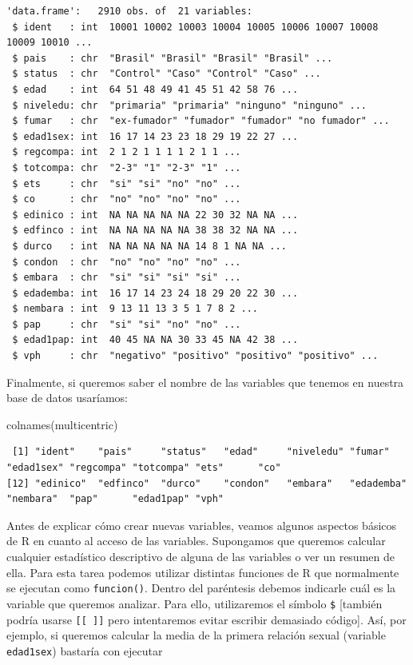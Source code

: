 \documentclass[
]{book}
\newenvironment{Shaded}{\begin{snugshade}}{\end{snugshade}}
\newcommand{\FunctionTok}[1]{\textcolor[rgb]{0.00,0.00,0.00}{#1}}
\newcommand{\NormalTok}[1]{#1}
\begin{document}
\begin{verbatim}
'data.frame':   2910 obs. of  21 variables:
 $ ident   : int  10001 10002 10003 10004 10005 10006 10007 10008 10009 10010 ...
 $ pais    : chr  "Brasil" "Brasil" "Brasil" "Brasil" ...
 $ status  : chr  "Control" "Caso" "Control" "Caso" ...
 $ edad    : int  64 51 48 49 41 45 51 42 58 76 ...
 $ niveledu: chr  "primaria" "primaria" "ninguno" "ninguno" ...
 $ fumar   : chr  "ex-fumador" "fumador" "fumador" "no fumador" ...
 $ edad1sex: int  16 17 14 23 23 18 29 19 22 27 ...
 $ regcompa: int  2 1 2 1 1 1 1 2 1 1 ...
 $ totcompa: chr  "2-3" "1" "2-3" "1" ...
 $ ets     : chr  "si" "si" "no" "no" ...
 $ co      : chr  "no" "no" "no" "no" ...
 $ edinico : int  NA NA NA NA NA 22 30 32 NA NA ...
 $ edfinco : int  NA NA NA NA NA 38 38 32 NA NA ...
 $ durco   : int  NA NA NA NA NA 14 8 1 NA NA ...
 $ condon  : chr  "no" "no" "no" "no" ...
 $ embara  : chr  "si" "si" "si" "si" ...
 $ edademba: int  16 17 14 23 24 18 29 20 22 30 ...
 $ nembara : int  9 13 11 13 3 5 1 7 8 2 ...
 $ pap     : chr  "si" "si" "no" "no" ...
 $ edad1pap: int  40 45 NA NA 30 33 45 NA 42 38 ...
 $ vph     : chr  "negativo" "positivo" "positivo" "positivo" ...
\end{verbatim}

Finalmente, si queremos saber el nombre de las variables que tenemos en nuestra base de datos usaríamos:

\begin{Shaded}
\begin{Highlighting}[]
\FunctionTok{colnames}\NormalTok{(multicentric)}
\end{Highlighting}
\end{Shaded}

\begin{verbatim}
 [1] "ident"    "pais"     "status"   "edad"     "niveledu" "fumar"    "edad1sex" "regcompa" "totcompa" "ets"      "co"      
[12] "edinico"  "edfinco"  "durco"    "condon"   "embara"   "edademba" "nembara"  "pap"      "edad1pap" "vph"     
\end{verbatim}

Antes de explicar cómo crear nuevas variables, veamos algunos aspectos básicos de R en cuanto al acceso de las variables. Supongamos que queremos calcular cualquier estadístico descriptivo de alguna de las variables o ver un resumen de ella. Para esta tarea podemos utilizar distintas funciones de R que normalmente se ejecutan como \texttt{funcion()}. Dentro del paréntesis debemos indicarle cuál es la variable que queremos analizar. Para ello, utilizaremos el símbolo \texttt{\$} {[}también podría usarse \texttt{{[}{[}\ {]}{]}} pero intentaremos evitar escribir demasiado código{]}. Así, por ejemplo, si queremos calcular la media de la primera relación sexual (variable \texttt{edad1sex}) bastaría con ejecutar
\end{document}
